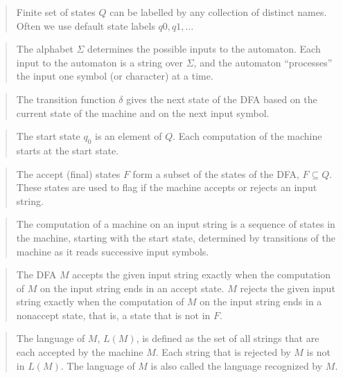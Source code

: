 \documentclass[12pt, oneside]{article}
\begin{document}
\begin{quote}
Finite set of states $Q$ can be labelled by any collection of distinct names. Often
we use default state labels $q0, q1, \ldots$ 
\end{quote}

\begin{quote}  
The alphabet $\Sigma$ determines the possible inputs to the automaton. 
Each input to the automaton is a string over  $\Sigma$, and the automaton ``processes'' the input
one symbol (or character) at a time.
\end{quote}

\begin{quote}
The transition function $\delta$ gives the next state of the DFA based on the current state of 
the machine and on the next input symbol.
\end{quote}

\begin{quote}
The start state $q_0$ is an element of $Q$.  Each computation of the machine starts at the  start  state.
\end{quote}

\begin{quote}
The accept (final) states $F$ form a subset of the states of the DFA, $F \subseteq  Q$. 
These states are used to flag if the machine accepts or rejects an input string.
\end{quote}


\begin{quote}
The computation of a machine on an input string is a sequence of states
in the machine,  starting with the start state, determined by transitions 
of the machine as it reads successive input symbols.
\end{quote}

\begin{quote}
The DFA $M$ accepts the given input string exactly when the computation of $M$ on the input string
ends in an accept state. $M$ rejects the given input string exactly when the computation of 
$M$ on the input string ends in a nonaccept state, that is, a state that is not in $F$.
\end{quote}

\begin{quote} 
The language of $M$, $L(M)$, is defined as the set of  all strings that are each accepted 
by the machine $M$. Each string that is rejected by $M$ is not in $L(M)$.
The language of $M$ is also called the language recognized by $M$.
\end{quote}   
   
\end{document}
